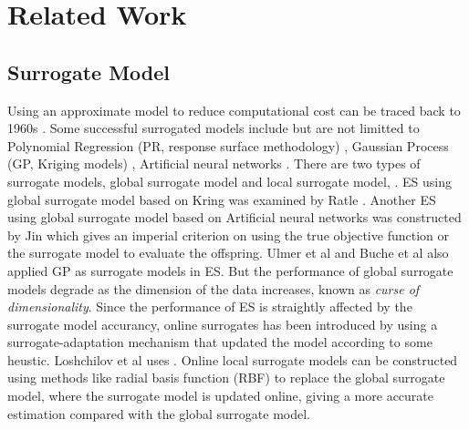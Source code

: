 \section{Related Work}

\subsection{Surrogate Model} 

Using an approximate model to reduce computational cost can be traced back to 1960s \cite{dunham1963design}. Some successful surrogated models include but are not limitted to Polynomial Regression (PR, response surface methodology) \cite{doi:10.1080/00401706.1966.10490404}, Gaussian Process (GP, Kriging models) \cite{sacks1989}, Artificial neural networks \cite{Smith:1993:NNS:583180}. There are two types of surrogate models, global surrogate model and local surrogate model, . ES using global surrogate model based on Kring was examined by Ratle \cite{Ratle:2001:KSF:966173.966177}. Another ES using global surrogate model based on Artificial neural networks was constructed by Jin \cite{Jin02aframework} which gives an imperial criterion on using the true objective function or the surrogate model to evaluate the offspring. Ulmer et al \cite{Ulmer03evolutionstrategies} and Buche et al \cite{1424193} also applied GP as surrogate models in ES. But the performance of global surrogate models degrade as the dimension of the data increases, known as \textit{curse of dimensionality}. Since the performance of ES is straightly affected by the surrogate model accurancy, online surrogates has been introduced by using a surrogate-adaptation mechanism that updated the model according to some heustic. Loshchilov et al \cite{loshchilov2012self} uses .
Online local surrogate models \cite{4033013} can be constructed using methods like radial basis function (RBF) \cite{GIANNAKOGLOU200243} to replace the global surrogate model, where the surrogate model is updated online, giving a more accurate estimation compared with the global surrogate model.







